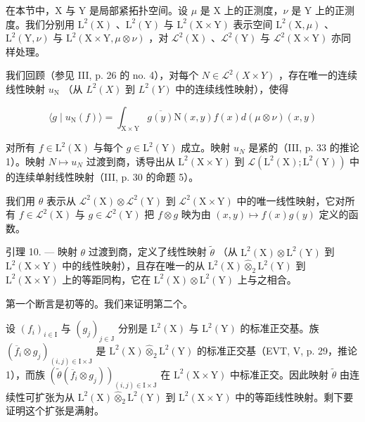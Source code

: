在本节中，X 与 Y 是局部紧拓扑空间。设 \(\mu\) 是 X 上的正测度，\(\nu\) 是 Y 上的正测度。我们分别用 \(\mathrm{L}^{2}(\mathrm{X})\) 、\(\mathrm{L}^{2}(\mathrm{Y})\) 与 \(\mathrm{L}^{2}(\mathrm{X} \times \mathrm{Y})\) 表示空间 \(\mathrm{L}^{2}(\mathrm{X}, \mu)\) 、\(\mathrm{L}^{2}(\mathrm{Y}, \nu)\) 与 \(\mathrm{L}^{2}(\mathrm{X} \times \mathrm{Y}, \mu \otimes \nu)\) ，对 \(\mathcal{L}^{2}(\mathrm{X})\) 、\(\mathcal{L}^{2}(\mathrm{Y})\) 与 \(\mathcal{L}^{2}(\mathrm{X} \times \mathrm{Y})\) 亦同样处理。

我们回顾（参见 III, p. 26 的 no. 4），对每个 \(N \in \mathcal{L}^{2}(X \times Y)\) ，存在唯一的连续线性映射 \(u_{\mathrm{N}}\) （从 \(L^{2}(X)\) 到 \(L^{2}(Y)\) 中的连续线性映射），使得

\[
\langle g \mid u _ {\mathrm{N}} (f) \rangle = \int_ {\mathrm{X} \times \mathrm{Y}} \overline {{g (y)}} \mathrm{N} (x, y) f (x) d (\mu \otimes \nu) (x, y)\tag{12}
\]

对所有 \(f \in \mathrm{L}^{2}(\mathrm{X})\) 与每个 \(g \in \mathrm{L}^{2}(\mathrm{Y})\) 成立。映射 \(u_{N}\) 是紧的（III, p. 33 的推论 1）。映射 \(N \mapsto u_{N}\) 过渡到商，诱导出从 \(\mathrm{L}^{2}(\mathrm{X} \times \mathrm{Y})\) 到 \(\mathcal{L}(\mathrm{L}^{2}(\mathrm{X});\mathrm{L}^{2}(\mathrm{Y}))\) 中的连续单射线性映射（III, p. 30 的命题 5）。

我们用 \(\theta\) 表示从 \(\mathcal{L}^2 (\mathrm{X})\otimes \mathcal{L}^2 (\mathrm{Y})\) 到 \(\mathcal{L}^2 (\mathrm{X}\times \mathrm{Y})\) 中的唯一线性映射，它对所有 \(f\in \mathcal{L}^2 (\mathrm{X})\) 与 \(g\in \mathcal{L}^2 (\mathrm{Y})\) 把 \(f\otimes g\) 映为由 \((x,y)\mapsto f(x)g(y)\) 定义的函数。

引理 10. --- 映射 \(\theta\) 过渡到商，定义了线性映射 \(\widetilde{\theta}\) （从 \(\mathrm{L}^2 (\mathrm{X})\otimes \mathrm{L}^2 (\mathrm{Y})\) 到 \(\mathrm{L}^2 (\mathrm{X}\times \mathrm{Y})\) 中的线性映射），且存在唯一的从 \(\mathrm{L}^2 (\mathrm{X})\widehat{\otimes}_2\mathrm{L}^2 (\mathrm{Y})\) 到 \(\mathrm{L}^2 (\mathrm{X}\times \mathrm{Y})\) 上的等距同构，它在 \(\mathrm{L}^2 (\mathrm{X})\otimes \mathrm{L}^2 (\mathrm{Y})\) 上与之相合。

第一个断言是初等的。我们来证明第二个。

设 \((f_i)_{i\in \mathrm{I}}\) 与 \((g_j)_{j\in \mathrm{J}}\) 分别是 \(\mathrm{L}^2 (\mathrm{X})\) 与 \(\mathrm{L}^2 (\mathrm{Y})\) 的标准正交基。族 \((\overline{f}_i\otimes g_j)_{(i,j)\in \mathrm{I}\times \mathrm{J}}\) 是 \(\mathrm{L}^2 (\mathrm{X})\widehat{\otimes}_2\mathrm{L}^2 (\mathrm{Y})\) 的标准正交基（EVT, V, p. 29，推论 1），而族 \((\widetilde{\theta} (\overline{f}_i\otimes g_j))_{(i,j)\in \mathrm{I}\times \mathrm{J}}\) 在 \(\mathrm{L}^2 (\mathrm{X}\times \mathrm{Y})\) 中标准正交。因此映射 \(\widetilde{\theta}\) 由连续性可扩张为从 \(\mathrm{L}^2 (\mathrm{X})\widehat{\otimes}_2\mathrm{L}^2 (\mathrm{Y})\) 到 \(\mathrm{L}^2 (\mathrm{X}\times \mathrm{Y})\) 中的等距线性映射。剩下要证明这个扩张是满射。

